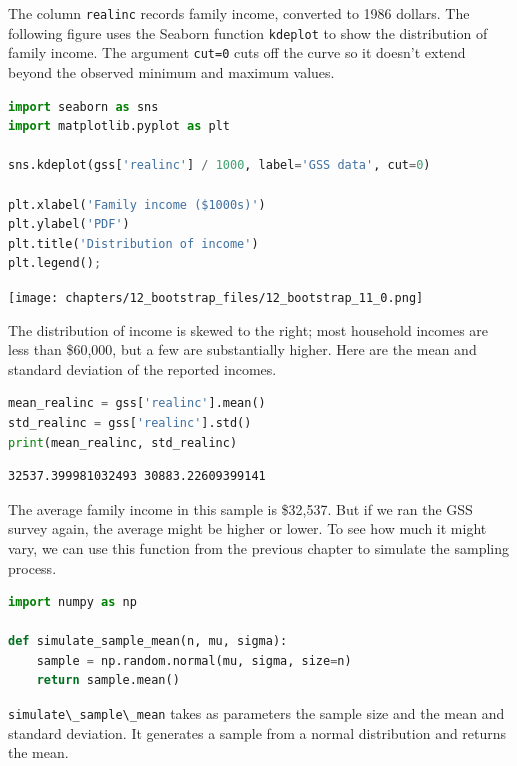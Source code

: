 The column \passthrough{\lstinline!realinc!} records family income,
converted to 1986 dollars. The following figure uses the Seaborn
function \passthrough{\lstinline!kdeplot!} to show the distribution of
family income. The argument \passthrough{\lstinline!cut=0!} cuts off the
curve so it doesn't extend beyond the observed minimum and maximum
values.

\begin{lstlisting}[language=Python,style=source]
import seaborn as sns
import matplotlib.pyplot as plt

sns.kdeplot(gss['realinc'] / 1000, label='GSS data', cut=0)

plt.xlabel('Family income ($1000s)')
plt.ylabel('PDF')
plt.title('Distribution of income')
plt.legend();
\end{lstlisting}

\begin{center}
\texttt{[image: chapters/12\_bootstrap\_files/12\_bootstrap\_11\_0.png]}
\end{center}

The distribution of income is skewed to the right; most household
incomes are less than \$60,000, but a few are substantially higher. Here
are the mean and standard deviation of the reported incomes.

\begin{lstlisting}[language=Python,style=source]
mean_realinc = gss['realinc'].mean()
std_realinc = gss['realinc'].std()
print(mean_realinc, std_realinc)
\end{lstlisting}

\begin{lstlisting}[style=output]
32537.399981032493 30883.22609399141
\end{lstlisting}

The average family income in this sample is \$32,537. But if we ran the
GSS survey again, the average might be higher or lower. To see how much
it might vary, we can use this function from the previous chapter to
simulate the sampling process.

\begin{lstlisting}[language=Python,style=source]
import numpy as np

def simulate_sample_mean(n, mu, sigma):
    sample = np.random.normal(mu, sigma, size=n)
    return sample.mean()
\end{lstlisting}

\passthrough{\lstinline!simulate\_sample\_mean!} takes as parameters the
sample size and the mean and standard deviation. It generates a sample
from a normal distribution and returns the mean.

